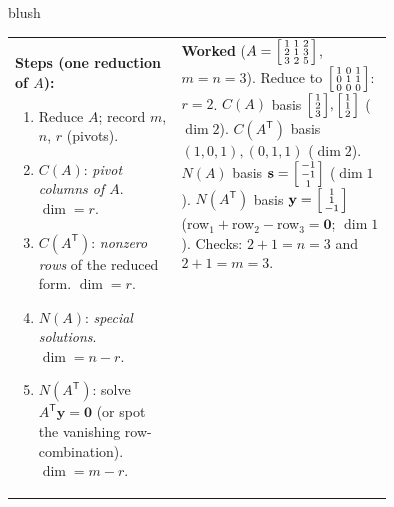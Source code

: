 \documentclass[10pt]{article}
\newcommand{\yy}{\mathbf{y}}
\newcommand{\svec}{\mathbf{s}}
\newcommand{\zero}{\mathbf{0}}
\newcommand{\T}{\mathsf{T}}
\begin{document}
\begin{skillbox}{blush}
\begin{tabularx}{\linewidth}{@{}p{0.44\linewidth} X@{}}
\textbf{Steps (one reduction of $A$):}
\begin{enumerate}[leftmargin=1.3em, nosep]
  \item Reduce $A$; record $m$, $n$, $r$ (pivots).
  \item $C(A)$: \emph{pivot columns of $A$}. $\dim=r$.
  \item $C(A^{\T})$: \emph{nonzero rows} of the reduced form. $\dim=r$.
  \item $N(A)$: \emph{special solutions}. $\dim=n-r$.
  \item $N(A^{\T})$: solve $A^{\T}\yy=\zero$ (or spot the vanishing row-combination). $\dim=m-r$.
\end{enumerate}
&
\vspace{-2pt}
\textbf{Worked} ($A=\begin{bsmallmatrix} 1&1&2\\2&1&3\\3&2&5 \end{bsmallmatrix}$, $m=n=3$). Reduce to
$\begin{bsmallmatrix} 1&0&1\\0&1&1\\0&0&0 \end{bsmallmatrix}$: $r=2$. $C(A)$ basis
$\begin{bsmallmatrix} 1\\2\\3 \end{bsmallmatrix},\begin{bsmallmatrix} 1\\1\\2 \end{bsmallmatrix}$ ($\dim2$).
$C(A^{\T})$ basis $(1,0,1),(0,1,1)$ ($\dim2$). $N(A)$ basis $\svec=\begin{bsmallmatrix} -1\\-1\\1 \end{bsmallmatrix}$
($\dim1$). $N(A^{\T})$ basis $\yy=\begin{bsmallmatrix} 1\\1\\-1 \end{bsmallmatrix}$ (row$_1+$row$_2-$row$_3=\zero$;
$\dim1$). Checks: $2+1=n=3$ and $2+1=m=3$.
\end{tabularx}
\end{skillbox}
\end{document}
